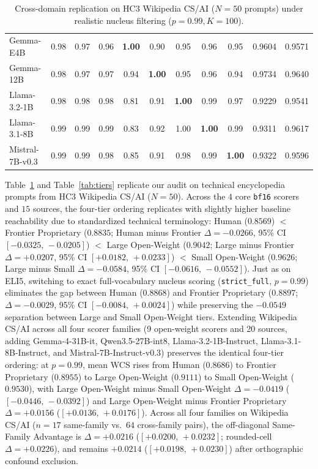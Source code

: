 \documentclass[11pt]{article}
\begin{document}
\begin{table}[t]
{\begin{tabular}{lcccccccccc}
Gemma-E4B & 0.98 & 0.97 & 0.96 & \textbf{1.00} & 0.90 & 0.95 & 0.96 & 0.95 & 0.9604 & 0.9571 \\
Gemma-12B & 0.98 & 0.97 & 0.97 & 0.94 & \textbf{1.00} & 0.95 & 0.96 & 0.94 & 0.9734 & 0.9640 \\
Llama-3.2-1B & 0.98 & 0.98 & 0.98 & 0.81 & 0.91 & \textbf{1.00} & 0.99 & 0.97 & 0.9229 & 0.9541 \\
Llama-3.1-8B & 0.99 & 0.99 & 0.99 & 0.83 & 0.92 & 1.00 & \textbf{1.00} & 0.99 & 0.9311 & 0.9617 \\
Mistral-7B-v0.3 & 0.99 & 0.99 & 0.98 & 0.85 & 0.91 & 0.98 & 0.99 & \textbf{1.00} & 0.9322 & 0.9596 \\
\bottomrule
\end{tabular}%
}
\caption{Cross-domain replication on HC3 Wikipedia CS/AI ($N=50$ prompts) under realistic nucleus filtering ($p=0.99, K=100$).}
\label{tab:wiki}
\end{table}

Table~\ref{tab:wiki} and Table~\ref{tab:tiers} replicate our audit on technical encyclopedia prompts from HC3 Wikipedia CS/AI ($N=50$). Across the $4$ core \texttt{bf16} scorers and $15$ sources, the four-tier ordering replicates with slightly higher baseline reachability due to standardized technical terminology: Human ($0.8569$) $<$ Frontier Proprietary ($0.8835$; Human minus Frontier $\Delta = -0.0266$, 95\% CI $[-0.0325,\,-0.0205]$) $<$ Large Open-Weight ($0.9042$; Large minus Frontier $\Delta = +0.0207$, 95\% CI $[+0.0182,\,+0.0233]$) $<$ Small Open-Weight ($0.9626$; Large minus Small $\Delta = -0.0584$, 95\% CI $[-0.0616,\,-0.0552]$). Just as on ELI5, switching to exact full-vocabulary nucleus scoring (\texttt{strict\_full}, $p=0.99$) eliminates the gap between Human ($0.8868$) and Frontier Proprietary ($0.8897$; $\Delta = -0.0029$, 95\% CI $[-0.0084,\,+0.0024]$) while preserving the $-0.0549$ separation between Large and Small Open-Weight tiers. Extending Wikipedia CS/AI across all four scorer families (9 open-weight scorers and 20 sources, adding Gemma-4-31B-it, Qwen3.5-27B-int8, Llama-3.2-1B-Instruct, Llama-3.1-8B-Instruct, and Mistral-7B-Instruct-v0.3) preserves the identical four-tier ordering: at $p=0.99$, mean WCS rises from Human ($0.8686$) to Frontier Proprietary ($0.8955$) to Large Open-Weight ($0.9111$) to Small Open-Weight ($0.9530$), with Large Open-Weight minus Small Open-Weight $\Delta = -0.0419$ ($[-0.0446,\,-0.0392]$) and Large Open-Weight minus Frontier Proprietary $\Delta = +0.0156$ ($[+0.0136,\,+0.0176]$). Across all four families on Wikipedia CS/AI ($n=17$ same-family vs.\ $64$ cross-family pairs), the off-diagonal Same-Family Advantage is $\Delta = +0.0216$ ($[+0.0200,\,+0.0232]$; rounded-cell $\Delta = +0.0226$), and remains $+0.0214$ ($[+0.0198,\,+0.0230]$) after orthographic confound exclusion.
\end{document}
